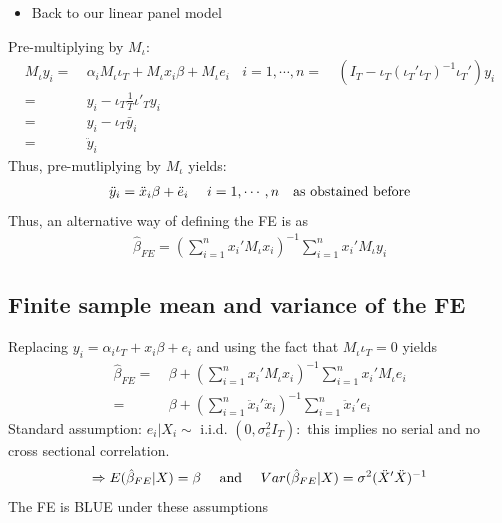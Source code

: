 \documentclass[a4paper,twoside,11pt]{article}
\begin{document}
\begin{itemize}
    \item Back to our linear panel model
\end{itemize}
Pre-multiplying by $M_\iota$:
\begin{equation*}
\begin{aligned}
M_\iota y_i =& \  \alpha_i M_\iota \iota_T + M_\iota x_i \beta + M_\iota e_i \ \ \ \ i=1,\cdots , n
=& \ (I_T - \iota_T (\iota_T' \iota_T)^{-1} \iota_T')y_i \\
=& \ y_i - \iota_T \frac{1}{T} \iota'_T y_i \\
=& \ y_i - \iota_T \bar y_i \\
=& \ \ddot y_i
\end{aligned}
\end{equation*}
Thus, pre-mutliplying by $M_\iota$ yields:
\begin{equation*}
\begin{aligned}
\ddot y_i = \ddot x_i \beta + \ddot e_i \ \ \ \ i = 1,\cdots, n \ \ \ \textmd{as obstained before}
\end{aligned}
\end{equation*}
\textcolor{NavyBlue}{
Thus, an alternative way of defining the FE is as
\begin{equation*}
\begin{aligned}
\hat{\beta}_{FE} = (\sum^n_{i=1} x_i' M_\iota x_i)^{-1} \sum^n_{i=1} x_i' M_\iota y_i
\end{aligned}
\end{equation*}
}
\subsection{Finite sample mean and variance of the FE}
Replacing $y_i = \alpha_i \iota_T + x_i \beta + e_i$ and using the fact that $M_\iota \iota_T =0$ yields
\begin{equation*}
\begin{aligned}
\hat{\beta}_{FE} =& \ \beta + (\sum^n_{i=1} x_i' M_\iota x_i)^{-1} \sum^n_{i=1} x_i' M_\iota e_i \\
=& \ \beta + (\sum^n_{i=1} \ddot x_i' \ddot x_i)^{-1}\sum^n_{i=1} \ddot x_i' e_i
\end{aligned}
\end{equation*}
Standard assumption: $e_i | X_i \sim$ i.i.d. $(0,\sigma_e^2 I_T):$ this implies no serial and no cross sectional correlation.
\begin{equation*}
\begin{aligned}
\Rightarrow E(\hat{\beta}_{FE}|X)=\beta \ \  \ \ \textmd{and} \ \ \ \ Var(\hat{\beta}_{FE}|X) = \sigma^2 (\ddot X' \ddot X)^{-1}
\end{aligned}
\end{equation*}
The FE is BLUE under these assumptions
\end{document}
